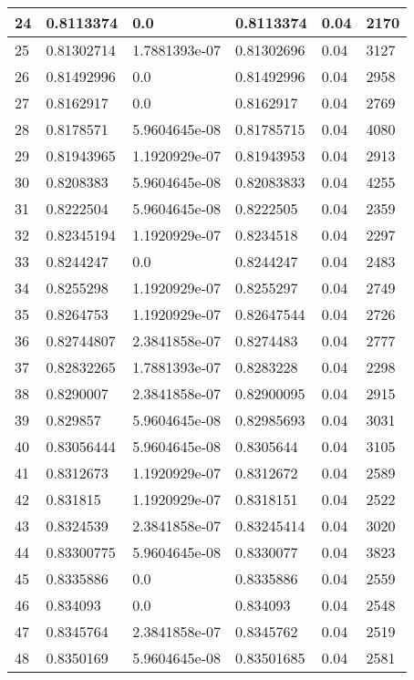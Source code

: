 \begin{longtable}{|l|l|l|l|l|l|}
24 & 0.8113374 & 0.0 & 0.8113374 & 0.04 & 2170 \\ \hline 
25 & 0.81302714 & 1.7881393e-07 & 0.81302696 & 0.04 & 3127 \\ \hline 
26 & 0.81492996 & 0.0 & 0.81492996 & 0.04 & 2958 \\ \hline 
27 & 0.8162917 & 0.0 & 0.8162917 & 0.04 & 2769 \\ \hline 
28 & 0.8178571 & 5.9604645e-08 & 0.81785715 & 0.04 & 4080 \\ \hline 
29 & 0.81943965 & 1.1920929e-07 & 0.81943953 & 0.04 & 2913 \\ \hline 
30 & 0.8208383 & 5.9604645e-08 & 0.82083833 & 0.04 & 4255 \\ \hline 
31 & 0.8222504 & 5.9604645e-08 & 0.8222505 & 0.04 & 2359 \\ \hline 
32 & 0.82345194 & 1.1920929e-07 & 0.8234518 & 0.04 & 2297 \\ \hline 
33 & 0.8244247 & 0.0 & 0.8244247 & 0.04 & 2483 \\ \hline 
34 & 0.8255298 & 1.1920929e-07 & 0.8255297 & 0.04 & 2749 \\ \hline 
35 & 0.8264753 & 1.1920929e-07 & 0.82647544 & 0.04 & 2726 \\ \hline 
36 & 0.82744807 & 2.3841858e-07 & 0.8274483 & 0.04 & 2777 \\ \hline 
37 & 0.82832265 & 1.7881393e-07 & 0.8283228 & 0.04 & 2298 \\ \hline 
38 & 0.8290007 & 2.3841858e-07 & 0.82900095 & 0.04 & 2915 \\ \hline 
39 & 0.829857 & 5.9604645e-08 & 0.82985693 & 0.04 & 3031 \\ \hline 
40 & 0.83056444 & 5.9604645e-08 & 0.8305644 & 0.04 & 3105 \\ \hline 
41 & 0.8312673 & 1.1920929e-07 & 0.8312672 & 0.04 & 2589 \\ \hline 
42 & 0.831815 & 1.1920929e-07 & 0.8318151 & 0.04 & 2522 \\ \hline 
43 & 0.8324539 & 2.3841858e-07 & 0.83245414 & 0.04 & 3020 \\ \hline 
44 & 0.83300775 & 5.9604645e-08 & 0.8330077 & 0.04 & 3823 \\ \hline 
45 & 0.8335886 & 0.0 & 0.8335886 & 0.04 & 2559 \\ \hline 
46 & 0.834093 & 0.0 & 0.834093 & 0.04 & 2548 \\ \hline 
47 & 0.8345764 & 2.3841858e-07 & 0.8345762 & 0.04 & 2519 \\ \hline 
48 & 0.8350169 & 5.9604645e-08 & 0.83501685 & 0.04 & 2581 \\ \hline 

\end{longtable}
